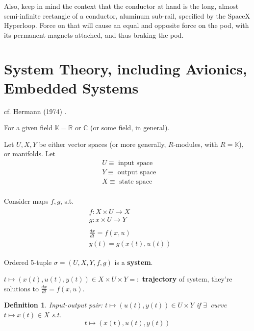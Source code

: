 \documentclass[10pt]{amsart}
\newtheorem{definition}{Definition}
\begin{document}
\begin{multicols*}{2}
Also, keep in mind the context that the conductor at hand is the long, almost semi-infinite rectangle of a conductor, aluminum sub-rail, specified by the SpaceX Hyperloop.  Force on that will cause an equal and opposite force on the pod, with its permanent magnets attached, and thus braking the pod.   

\part{System Theory, including Avionics, Embedded Systems}


cf. Hermann (1974) \cite{Herm1974}.  

For a given field $\mathbb{K} = \mathbb{R} \text{ or } \mathbb{C}$ (or some field, in general).  

Let $U,X,Y$ be either vector spaces (or more generally, $R$-modules, with $R=\mathbb{K}$), or manifolds.   Let
\[
\begin{aligned}
	& U \equiv \text{ input space } \\
	& Y \equiv \text{ output space } \\
	& X \equiv \text{ state space } \\
\end{aligned}
\]

Consider maps $f,g$, s.t. 
\begin{equation}
	\begin{gathered}
	\begin{aligned} 
& f: X\times U \to X \\
	& g : x \times U \to Y \end{aligned} \\
\begin{aligned}
	& \frac{dx}{dt} = f(x,u) \\ 
	& y(t) = g(x(t),u(t))  
\end{aligned}
\end{gathered}
\end{equation}
 
Ordered 5-tuple $\sigma = (U,X,Y,f,g)$ is a \textbf{system}.  

$t \mapsto (x(t),u(t),y(t)) \in X\times U \times Y =: $ \textbf{trajectory} of system, they're solutions to $\frac{dx}{dt} = f(x,u)$.  

\begin{definition}
	Input-output pair: $t\mapsto (u(t),y(t)) \in U\times Y$ if $\exists \, $ curve $t\mapsto x(t) \in X$ s.t. 
\begin{equation}
t\mapsto (x(t),u(t),y(t))
\end{equation}
\end{definition}


\end{multicols*}
\end{document}
